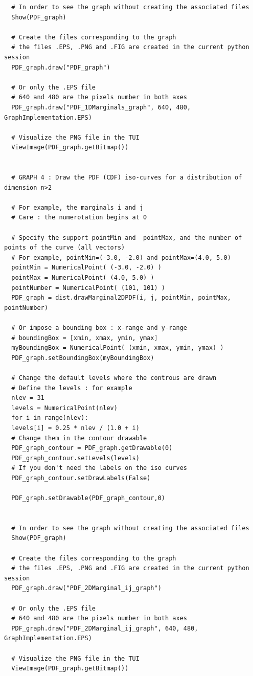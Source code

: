 \begin{lstlisting}
  # In order to see the graph without creating the associated files
  Show(PDF_graph)

  # Create the files corresponding to the graph
  # the files .EPS, .PNG and .FIG are created in the current python session
  PDF_graph.draw("PDF_graph")

  # Or only the .EPS file
  # 640 and 480 are the pixels number in both axes
  PDF_graph.draw("PDF_1DMarginals_graph", 640, 480, GraphImplementation.EPS)

  # Visualize the PNG file in the TUI
  ViewImage(PDF_graph.getBitmap())


  # GRAPH 4 : Draw the PDF (CDF) iso-curves for a distribution of dimension n>2

  # For example, the marginals i and j
  # Care : the numerotation begins at 0

  # Specify the support pointMin and  pointMax, and the number of points of the curve (all vectors)
  # For example, pointMin=(-3.0, -2.0) and pointMax=(4.0, 5.0)
  pointMin = NumericalPoint( (-3.0, -2.0) )
  pointMax = NumericalPoint( (4.0, 5.0) )
  pointNumber = NumericalPoint( (101, 101) )
  PDF_graph = dist.drawMarginal2DPDF(i, j, pointMin, pointMax, pointNumber)

  # Or impose a bounding box : x-range and y-range
  # boundingBox = [xmin, xmax, ymin, ymax]
  myBoundingBox = NumericalPoint( (xmin, xmax, ymin, ymax) )
  PDF_graph.setBoundingBox(myBoundingBox)

  # Change the default levels where the controus are drawn
  # Define the levels : for example
  nlev = 31
  levels = NumericalPoint(nlev)
  for i in range(nlev):
  levels[i] = 0.25 * nlev / (1.0 + i)
  # Change them in the contour drawable
  PDF_graph_contour = PDF_graph.getDrawable(0)
  PDF_graph_contour.setLevels(levels)
  # If you don't need the labels on the iso curves
  PDF_graph_contour.setDrawLabels(False)

  PDF_graph.setDrawable(PDF_graph_contour,0)


  # In order to see the graph without creating the associated files
  Show(PDF_graph)

  # Create the files corresponding to the graph
  # the files .EPS, .PNG and .FIG are created in the current python session
  PDF_graph.draw("PDF_2DMarginal_ij_graph")

  # Or only the .EPS file
  # 640 and 480 are the pixels number in both axes
  PDF_graph.draw("PDF_2DMarginal_ij_graph", 640, 480, GraphImplementation.EPS)

  # Visualize the PNG file in the TUI
  ViewImage(PDF_graph.getBitmap())
\end{lstlisting}
\textspace\\


